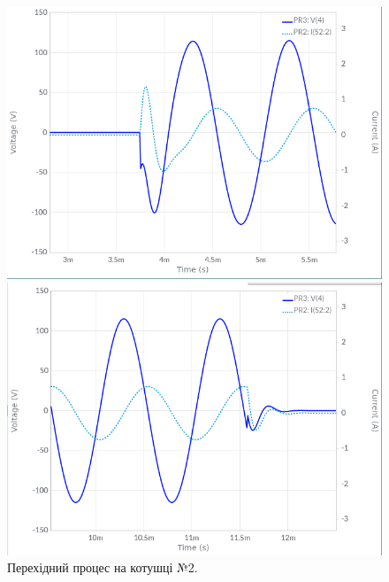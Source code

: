 \documentclass{article}
\begin{document}
\begin{normalsize}
	\begin{figure}[H]
		\begin{minipage}[t]{0.45\textwidth}
			\centering
			\includegraphics[width=\textwidth]{31}
		\end{minipage}
		\hfill
		\begin{minipage}[t]{0.45\textwidth}
			\centering
			\includegraphics[width=\textwidth]{32}
		\end{minipage}
		\caption{Перехідний процес на котушці №2.}
	\end{figure}
	

\end{normalsize}
\end{document}
